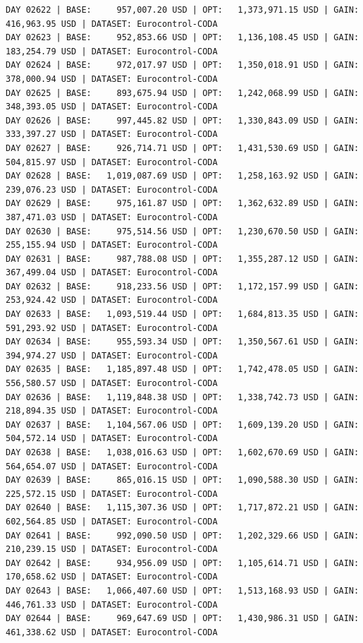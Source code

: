 \documentclass[11pt,a4paper]{article}
\begin{document}
\begin{verbatim}
DAY 02622 | BASE:     957,007.20 USD | OPT:   1,373,971.15 USD | GAIN: 416,963.95 USD | DATASET: Eurocontrol-CODA
DAY 02623 | BASE:     952,853.66 USD | OPT:   1,136,108.45 USD | GAIN: 183,254.79 USD | DATASET: Eurocontrol-CODA
DAY 02624 | BASE:     972,017.97 USD | OPT:   1,350,018.91 USD | GAIN: 378,000.94 USD | DATASET: Eurocontrol-CODA
DAY 02625 | BASE:     893,675.94 USD | OPT:   1,242,068.99 USD | GAIN: 348,393.05 USD | DATASET: Eurocontrol-CODA
DAY 02626 | BASE:     997,445.82 USD | OPT:   1,330,843.09 USD | GAIN: 333,397.27 USD | DATASET: Eurocontrol-CODA
DAY 02627 | BASE:     926,714.71 USD | OPT:   1,431,530.69 USD | GAIN: 504,815.97 USD | DATASET: Eurocontrol-CODA
DAY 02628 | BASE:   1,019,087.69 USD | OPT:   1,258,163.92 USD | GAIN: 239,076.23 USD | DATASET: Eurocontrol-CODA
DAY 02629 | BASE:     975,161.87 USD | OPT:   1,362,632.89 USD | GAIN: 387,471.03 USD | DATASET: Eurocontrol-CODA
DAY 02630 | BASE:     975,514.56 USD | OPT:   1,230,670.50 USD | GAIN: 255,155.94 USD | DATASET: Eurocontrol-CODA
DAY 02631 | BASE:     987,788.08 USD | OPT:   1,355,287.12 USD | GAIN: 367,499.04 USD | DATASET: Eurocontrol-CODA
DAY 02632 | BASE:     918,233.56 USD | OPT:   1,172,157.99 USD | GAIN: 253,924.42 USD | DATASET: Eurocontrol-CODA
DAY 02633 | BASE:   1,093,519.44 USD | OPT:   1,684,813.35 USD | GAIN: 591,293.92 USD | DATASET: Eurocontrol-CODA
DAY 02634 | BASE:     955,593.34 USD | OPT:   1,350,567.61 USD | GAIN: 394,974.27 USD | DATASET: Eurocontrol-CODA
DAY 02635 | BASE:   1,185,897.48 USD | OPT:   1,742,478.05 USD | GAIN: 556,580.57 USD | DATASET: Eurocontrol-CODA
DAY 02636 | BASE:   1,119,848.38 USD | OPT:   1,338,742.73 USD | GAIN: 218,894.35 USD | DATASET: Eurocontrol-CODA
DAY 02637 | BASE:   1,104,567.06 USD | OPT:   1,609,139.20 USD | GAIN: 504,572.14 USD | DATASET: Eurocontrol-CODA
DAY 02638 | BASE:   1,038,016.63 USD | OPT:   1,602,670.69 USD | GAIN: 564,654.07 USD | DATASET: Eurocontrol-CODA
DAY 02639 | BASE:     865,016.15 USD | OPT:   1,090,588.30 USD | GAIN: 225,572.15 USD | DATASET: Eurocontrol-CODA
DAY 02640 | BASE:   1,115,307.36 USD | OPT:   1,717,872.21 USD | GAIN: 602,564.85 USD | DATASET: Eurocontrol-CODA
DAY 02641 | BASE:     992,090.50 USD | OPT:   1,202,329.66 USD | GAIN: 210,239.15 USD | DATASET: Eurocontrol-CODA
DAY 02642 | BASE:     934,956.09 USD | OPT:   1,105,614.71 USD | GAIN: 170,658.62 USD | DATASET: Eurocontrol-CODA
DAY 02643 | BASE:   1,066,407.60 USD | OPT:   1,513,168.93 USD | GAIN: 446,761.33 USD | DATASET: Eurocontrol-CODA
DAY 02644 | BASE:     969,647.69 USD | OPT:   1,430,986.31 USD | GAIN: 461,338.62 USD | DATASET: Eurocontrol-CODA

\end{verbatim}
\end{document}
